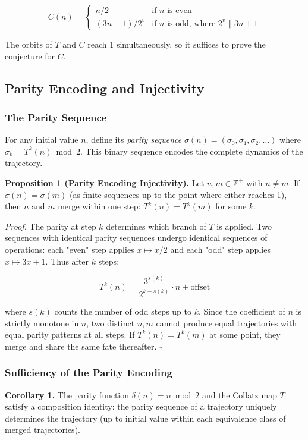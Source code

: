 \documentclass[12pt,a4paper]{article}
\begin{document}
\[C(n) = \begin{cases} n/2 & \text{if } n \text{ is even} \\ (3n+1)/2^v & \text{if } n \text{ is odd, where } 2^v \parallel 3n+1 \end{cases}\]

The orbits of $T$ and $C$ reach 1 simultaneously, so it suffices to prove the conjecture for $C$.

\subsection{Parity Encoding and Injectivity}

\subsubsection{The Parity Sequence}

For any initial value $n$, define its \emph{parity sequence} $\sigma(n) = (\sigma_0, \sigma_1, \sigma_2, \ldots)$ where $\sigma_k = T^k(n) \bmod 2$. This binary sequence encodes the complete dynamics of the trajectory.

\textbf{Proposition 1 (Parity Encoding Injectivity).} Let $n, m \in \mathbb{Z}^+$ with $n \neq m$. If $\sigma(n) = \sigma(m)$ (as finite sequences up to the point where either reaches 1), then $n$ and $m$ merge within one step: $T^k(n) = T^k(m)$ for some $k$.

\emph{Proof.} The parity at step $k$ determines which branch of $T$ is applied. Two sequences with identical parity sequences undergo identical sequences of operations: each "even" step applies $x \mapsto x/2$ and each "odd" step applies $x \mapsto 3x+1$. Thus after $k$ steps:

\[T^k(n) = \frac{3^{s(k)}}{2^{k-s(k)}} \cdot n + \text{offset}\]

where $s(k)$ counts the number of odd steps up to $k$. Since the coefficient of $n$ is strictly monotone in $n$, two distinct $n, m$ cannot produce equal trajectories with equal parity patterns at all steps. If $T^k(n) = T^k(m)$ at some point, they merge and share the same fate thereafter. $\square$

\subsubsection{Sufficiency of the Parity Encoding}

\textbf{Corollary 1.} The parity function $\delta(n) = n \bmod 2$ and the Collatz map $T$ satisfy a composition identity: the parity sequence of a trajectory uniquely determines the trajectory (up to initial value within each equivalence class of merged trajectories).
\end{document}
